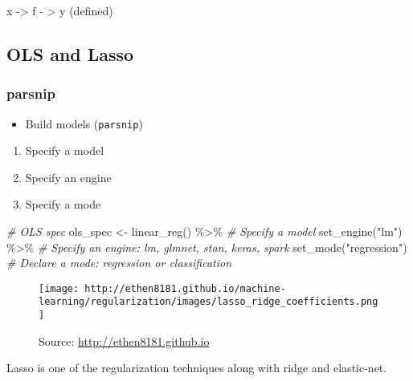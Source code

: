 \documentclass[
]{book}
\newenvironment{Shaded}{\begin{snugshade}}{\end{snugshade}}
\newcommand{\CommentTok}[1]{\textcolor[rgb]{0.56,0.35,0.01}{\textit{#1}}}
\newcommand{\FunctionTok}[1]{\textcolor[rgb]{0.00,0.00,0.00}{#1}}
\newcommand{\NormalTok}[1]{#1}
\newcommand{\OtherTok}[1]{\textcolor[rgb]{0.56,0.35,0.01}{#1}}
\newcommand{\SpecialCharTok}[1]{\textcolor[rgb]{0.00,0.00,0.00}{#1}}
\newcommand{\StringTok}[1]{\textcolor[rgb]{0.31,0.60,0.02}{#1}}
\providecommand{\tightlist}{%
  \setlength{\itemsep}{0pt}\setlength{\parskip}{0pt}}
\begin{document}
x -\textgreater{} f - \textgreater{} y (defined)

\hypertarget{ols-and-lasso}{%
\subsection{OLS and Lasso}\label{ols-and-lasso}}

\hypertarget{parsnip}{%
\subsubsection{parsnip}\label{parsnip}}

\begin{itemize}
\tightlist
\item
  Build models (\texttt{parsnip})
\end{itemize}

\begin{enumerate}
\def\labelenumi{\arabic{enumi}.}
\tightlist
\item
  Specify a model
\item
  Specify an engine
\item
  Specify a mode
\end{enumerate}

\begin{Shaded}
\begin{Highlighting}[]
\CommentTok{\# OLS spec}
\NormalTok{ols\_spec }\OtherTok{\textless{}{-}} \FunctionTok{linear\_reg}\NormalTok{() }\SpecialCharTok{\%\textgreater{}\%} \CommentTok{\# Specify a model}
  \FunctionTok{set\_engine}\NormalTok{(}\StringTok{"lm"}\NormalTok{) }\SpecialCharTok{\%\textgreater{}\%} \CommentTok{\# Specify an engine: lm, glmnet, stan, keras, spark}
  \FunctionTok{set\_mode}\NormalTok{(}\StringTok{"regression"}\NormalTok{) }\CommentTok{\# Declare a mode: regression or classification}
\end{Highlighting}
\end{Shaded}

\begin{figure}
\centering
\texttt{[image: http://ethen8181.github.io/machine-learning/regularization/images/lasso\_ridge\_coefficients.png]}
\caption{Source: \url{http://ethen8181.github.io}}
\end{figure}

Lasso is one of the regularization techniques along with ridge and elastic-net.
\end{document}
